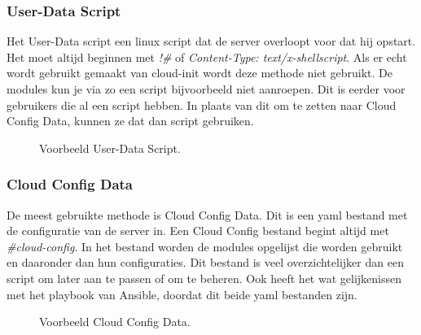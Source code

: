 \subsubsection{User-Data Script}
Het User-Data script een linux script dat de server overloopt voor dat hij opstart. Het moet altijd beginnen met \textit{!\#} of \textit{Content-Type: text/x-shellscript}. Als er echt wordt gebruikt gemaakt van cloud-init wordt deze methode niet gebruikt. De modules kun je via zo een script bijvoorbeeld niet aanroepen. Dit is eerder voor gebruikers die al een script hebben. In plaats van dit om te zetten naar Cloud Config Data, kunnen ze dat dan script gebruiken.
\begin{figure}[!htb]
	\caption{Voorbeeld User-Data Script.}
	\label{fig:udatascript}
\end{figure}

\subsubsection{Cloud Config Data}
De meest gebruikte methode is Cloud Config Data. Dit is een yaml bestand met de configuratie van de server in. Een Cloud Config bestand begint altijd met \textit{\#cloud-config}. In het bestand worden de modules opgelijst die worden gebruikt en daaronder dan hun configuraties. Dit bestand is veel overzichtelijker dan een script om later aan te passen of om te beheren. Ook heeft het wat gelijkenissen met het playbook van Ansible, doordat dit beide yaml bestanden zijn.
\begin{figure}[!htb]
	\caption{Voorbeeld Cloud Config Data.}
	\label{fig:udatascript}
\end{figure}

